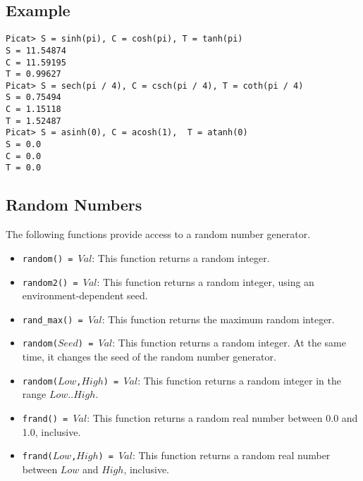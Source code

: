\subsection*{Example}
\begin{verbatim}
Picat> S = sinh(pi), C = cosh(pi), T = tanh(pi)
S = 11.54874
C = 11.59195
T = 0.99627
Picat> S = sech(pi / 4), C = csch(pi / 4), T = coth(pi / 4)
S = 0.75494
C = 1.15118
T = 1.52487
Picat> S = asinh(0), C = acosh(1),  T = atanh(0)
S = 0.0
C = 0.0
T = 0.0
\end{verbatim}

\subsection{Random Numbers}
The following functions provide access to a random number generator.
\begin{itemize}
\item \texttt{random() = $Val$}: This function returns a random integer.
\item \texttt{random2() = $Val$}: This function returns a random integer, using an environment-dependent seed.
\item \texttt{rand\_max() = $Val$}: This function returns the maximum random integer.
\item \texttt{random($Seed$) = $Val$}: This function returns a random integer.  At the same time, it changes the seed of the random number generator.
\item \texttt{random($Low$,$High$) = $Val$}: This function returns a random integer in the range $Low$..$High$.
\item \texttt{frand() = $Val$}: This function returns a random real number between 0.0 and 1.0, inclusive.
\item \texttt{frand($Low$,$High$) = $Val$}: This function returns a random real number between $Low$ and $High$, inclusive.

\end{itemize}


